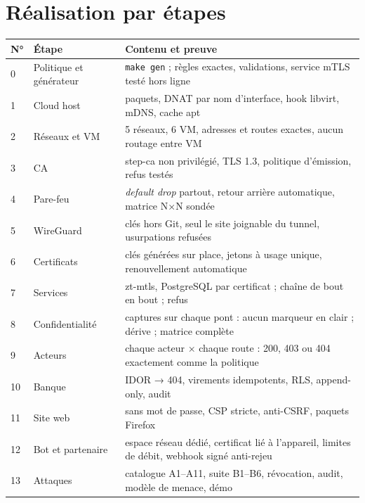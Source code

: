 \documentclass[11pt,a4paper]{article}
\newcommand{\cmd}[1]{\texttt{#1}}
\begin{document}
\section{Réalisation par étapes}
\begin{longtable}{@{}p{0.8cm}p{4.4cm}p{10.4cm}@{}}
\toprule
\textbf{N°} & \textbf{Étape} & \textbf{Contenu et preuve}\\
\midrule
\endhead
0 & Politique et générateur & \cmd{make gen} ; règles exactes, validations, service mTLS testé hors ligne\\
1 & Cloud host & paquets, DNAT par nom d'interface, hook libvirt, mDNS, cache apt\\
2 & Réseaux et VM & 5 réseaux, 6 VM, adresses et routes exactes, aucun routage entre VM\\
3 & CA & step-ca non privilégié, TLS 1.3, politique d'émission, refus testés\\
4 & Pare-feu & \emph{default drop} partout, retour arrière automatique, matrice N×N sondée\\
5 & WireGuard & clés hors Git, seul le site joignable du tunnel, usurpations refusées\\
6 & Certificats & clés générées sur place, jetons à usage unique, renouvellement automatique\\
7 & Services & zt-mtls, PostgreSQL par certificat ; chaîne de bout en bout ; refus\\
8 & Confidentialité & captures sur chaque pont : aucun marqueur en clair ; dérive ; matrice complète\\
9 & Acteurs & chaque acteur × chaque route : 200, 403 ou 404 exactement comme la politique\\
10 & Banque & IDOR → 404, virements idempotents, RLS, append-only, audit\\
11 & Site web & sans mot de passe, CSP stricte, anti-CSRF, paquets Firefox\\
12 & Bot et partenaire & espace réseau dédié, certificat lié à l'appareil, limites de débit, webhook signé anti-rejeu\\
13 & Attaques & catalogue A1--A11, suite B1--B6, révocation, audit, modèle de menace, démo\\
\bottomrule
\end{longtable}
\end{document}
